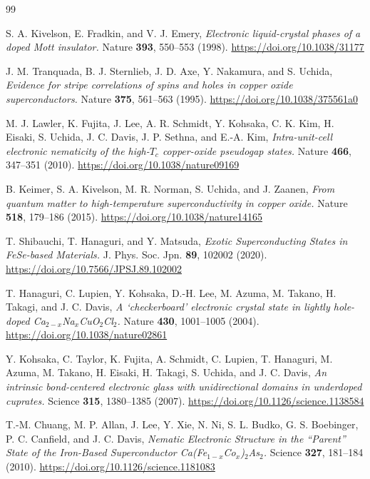 \documentclass[reprint,superscriptaddress,prb,aps]{revtex4-2}
\begin{document}
\begin{thebibliography}{99}

S. A. Kivelson, E. Fradkin, and V. J. Emery,
\textit{Electronic liquid-crystal phases of a doped Mott insulator.}
Nature \textbf{393}, 550--553 (1998).
\url{https://doi.org/10.1038/31177}


J. M. Tranquada, B. J. Sternlieb, J. D. Axe, Y. Nakamura, and S. Uchida,
\textit{Evidence for stripe correlations of spins and holes in copper oxide superconductors.}
Nature \textbf{375}, 561--563 (1995).
\url{https://doi.org/10.1038/375561a0}


M. J. Lawler, K. Fujita, J. Lee, A. R. Schmidt, Y. Kohsaka, C. K. Kim, H. Eisaki, S. Uchida, J. C. Davis, J. P. Sethna, and E.-A. Kim,
\textit{Intra-unit-cell electronic nematicity of the high-$T_{c}$ copper-oxide pseudogap states.}
Nature \textbf{466}, 347--351 (2010).
\url{https://doi.org/10.1038/nature09169}


B. Keimer, S. A. Kivelson, M. R. Norman, S. Uchida, and J. Zaanen,
\textit{From quantum matter to high-temperature superconductivity in copper oxide.}
Nature \textbf{518}, 179--186 (2015).
\url{https://doi.org/10.1038/nature14165}


T. Shibauchi, T. Hanaguri, and Y. Matsuda,
\textit{Exotic Superconducting States in FeSe-based Materials.}
J. Phys. Soc. Jpn. \textbf{89}, 102002 (2020).
\url{https://doi.org/10.7566/JPSJ.89.102002}


T. Hanaguri, C. Lupien, Y. Kohsaka, D.-H. Lee, M. Azuma, M. Takano, H. Takagi, and J. C. Davis,
\textit{A `checkerboard' electronic crystal state in lightly hole-doped Ca$_{2-x}$Na$_{x}$CuO$_{2}$Cl$_{2}$.}
Nature \textbf{430}, 1001--1005 (2004).
\url{https://doi.org/10.1038/nature02861}


Y. Kohsaka, C. Taylor, K. Fujita, A. Schmidt, C. Lupien, T. Hanaguri, M. Azuma, M. Takano, H. Eisaki, H. Takagi, S. Uchida, and J. C. Davis,
\textit{An intrinsic bond-centered electronic glass with unidirectional domains in underdoped cuprates.}
Science \textbf{315}, 1380--1385 (2007).
\url{https://doi.org/10.1126/science.1138584}


T.-M. Chuang, M. P. Allan, J. Lee, Y. Xie, N. Ni, S. L. Budko, G. S. Boebinger, P. C. Canfield, and J. C. Davis,
\textit{Nematic Electronic Structure in the ``Parent'' State of the Iron-Based Superconductor Ca(Fe$_{1-x}$Co$_{x}$)$_{2}$As$_{2}$.}
Science \textbf{327}, 181--184 (2010).
\url{https://doi.org/10.1126/science.1181083}



\end{thebibliography}
\end{document}
